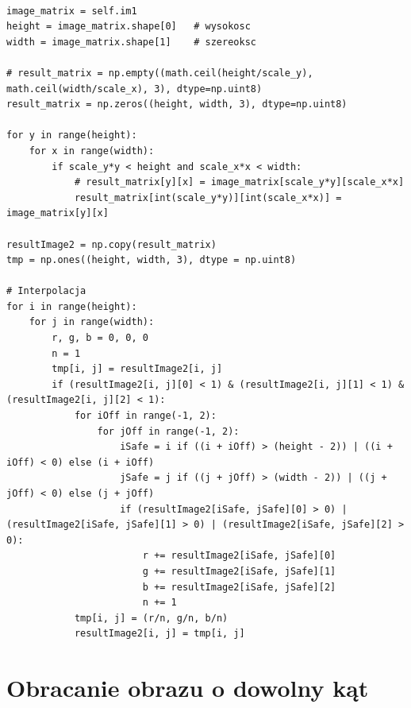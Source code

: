 \documentclass[final,a4paper,openany,12pt]{mwbk}
\begin{document}
\begin{lstlisting}[caption= Niejednorodne skalowanie obrazu]

image_matrix = self.im1
height = image_matrix.shape[0]   # wysokosc
width = image_matrix.shape[1]    # szereoksc

# result_matrix = np.empty((math.ceil(height/scale_y), math.ceil(width/scale_x), 3), dtype=np.uint8)
result_matrix = np.zeros((height, width, 3), dtype=np.uint8)

for y in range(height):
    for x in range(width): 
        if scale_y*y < height and scale_x*x < width:
            # result_matrix[y][x] = image_matrix[scale_y*y][scale_x*x]
            result_matrix[int(scale_y*y)][int(scale_x*x)] = image_matrix[y][x]

resultImage2 = np.copy(result_matrix)
tmp = np.ones((height, width, 3), dtype = np.uint8)

# Interpolacja
for i in range(height):
    for j in range(width):
        r, g, b = 0, 0, 0
        n = 1
        tmp[i, j] = resultImage2[i, j]
        if (resultImage2[i, j][0] < 1) & (resultImage2[i, j][1] < 1) & (resultImage2[i, j][2] < 1):
            for iOff in range(-1, 2):
                for jOff in range(-1, 2):
                    iSafe = i if ((i + iOff) > (height - 2)) | ((i + iOff) < 0) else (i + iOff)
                    jSafe = j if ((j + jOff) > (width - 2)) | ((j + jOff) < 0) else (j + jOff)
                    if (resultImage2[iSafe, jSafe][0] > 0) | (resultImage2[iSafe, jSafe][1] > 0) | (resultImage2[iSafe, jSafe][2] > 0):
                        r += resultImage2[iSafe, jSafe][0]
                        g += resultImage2[iSafe, jSafe][1]
                        b += resultImage2[iSafe, jSafe][2]
                        n += 1
            tmp[i, j] = (r/n, g/n, b/n)
            resultImage2[i, j] = tmp[i, j]

\end{lstlisting}


\section{ Obracanie obrazu o dowolny kąt}


\hfill
\\\\
\indent
\end{document}
